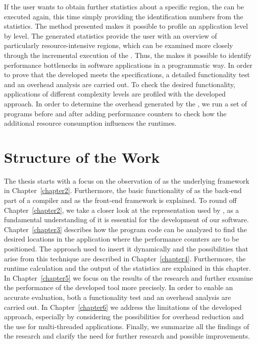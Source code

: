 If the user wants to obtain further statistics about a specific region, the \TOOL can be executed again, this time simply providing the identification numbers from the statistics. The method presented makes it possible to profile an application level by level. The generated statistics provide the user with an overview of particularly resource-intensive regions, which can be examined more closely through the incremental execution of the \TOOL. Thus, the \TOOL makes it possible to identify performance bottlenecks in software applications in a programmatic way. In order to prove that the developed \TOOL meets the specifications, a detailed functionality test and an overhead analysis are carried out. To check the desired functionality, applications of different complexity levels are profiled with the developed approach. In order to determine the overhead generated by the \TOOL, we run a set of programs before and after adding performance counters to check how the additional resource consumption influences the runtimes.

\section{Structure of the Work}
The thesis starts with a focus on the observation of \CLANG as the underlying framework in Chapter~\ref{chapter2}. Furthermore, the basic functionality of \LLVM as the back-end part of a compiler and \CLANG as the front-end framework is explained. To round off Chapter~\ref{chapter2}, we take a closer look at the representation used by \CLANG, as a fundamental understanding of it is essential for the development of our software. Chapter~\ref{chapter3} describes how the program code can be analyzed to find the desired locations in the application where the performance counters are to be positioned. The approach used to insert it dynamically and the possibilities that arise from this technique are described in Chapter~\ref{chapter4}. Furthermore, the runtime calculation and the output of the statistics are explained in this chapter. In Chapter~\ref{chapter5} we focus on the results of the research and further examine the performance of the developed tool more precisely. In order to enable an accurate evaluation, both a functionality test and an overhead analysis are carried out. In Chapter~\ref{chapter6} we address the limitations of the developed approach, especially by considering the possibilities for overhead reduction and the use for multi-threaded applications. Finally, we summarize all the findings of the research and clarify the need for further research and possible improvements.